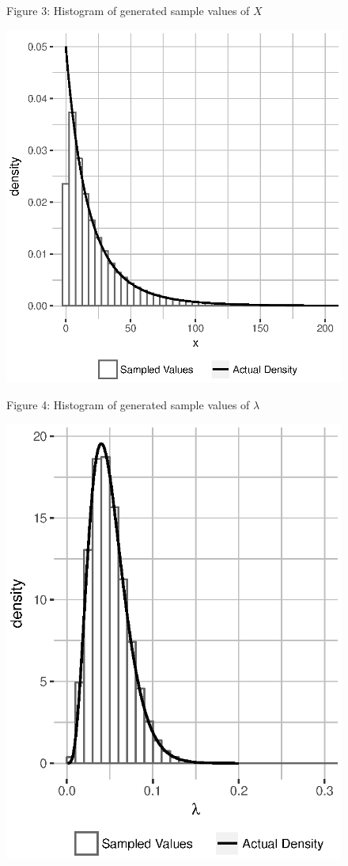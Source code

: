 \documentclass[11pt, oneside]{article}
\newcommand*{\figuretitle}[1]{
    {\centering
    \tiny{#1}
    \par\medskip}
}
\begin{document}
\begin{figure}[h]
   \begin{minipage}{0.45\textwidth}
      \figuretitle{Figure 3: Histogram of generated sample values of $X$}
      \centering\includegraphics[scale=0.35]{Figure3}
    \end{minipage}
    \begin{minipage}{0.45\textwidth}
      \figuretitle{Figure 4: Histogram of generated sample values of $\lambda$}
        \centering\includegraphics[scale=0.35]{Figure4}

\end{minipage}
\end{figure}
\end{document}
